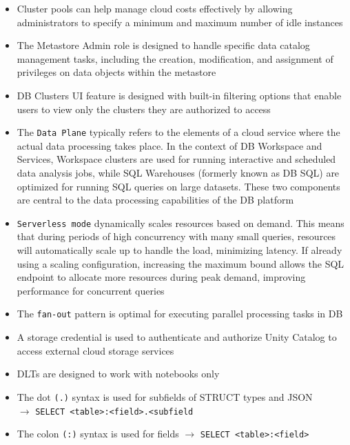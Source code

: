 \documentclass[11pt]{scrartcl}
\begin{document}
\begin{itemize}
	\item Cluster pools can help manage cloud costs effectively by allowing administrators to specify a minimum and maximum number of idle instances
	\item The Metastore Admin role is designed to handle specific data catalog management tasks, including the creation, modification, and assignment of privileges on data objects within the metastore
	\item DB Clusters UI feature is designed with built-in filtering options that enable users to view only the clusters they are authorized to access
	\item The \texttt{Data Plane} typically refers to the elements of a cloud service where the actual data processing takes place. In the context of DB Workspace and Services, Workspace clusters are used for running interactive and scheduled data analysis jobs, while SQL Warehouses (formerly known as DB SQL) are optimized for running SQL queries on large datasets. These two components are central to the data processing capabilities of the DB platform
	\item \texttt{Serverless mode} dynamically scales resources based on demand. This means that during periods of high concurrency with many small queries, resources will automatically scale up to handle the load, minimizing latency. If already using a scaling configuration, increasing the maximum bound allows the SQL endpoint to allocate more resources during peak demand, improving performance for concurrent queries
	\item The \texttt{fan-out} pattern is optimal for executing parallel processing tasks in DB
	\item A storage credential is used to authenticate and authorize Unity Catalog to access external cloud storage services
	\item DLTs are designed to work with notebooks only 
	\item The dot \texttt{(.)} syntax is used for subfields of STRUCT types and JSON\\ $\to$ \texttt{SELECT <table>:<field>.<subfield}
	\item The colon \texttt{(:)} syntax is used for fields $\to$ \texttt{SELECT <table>:<field>}


\end{itemize}
\end{document}
